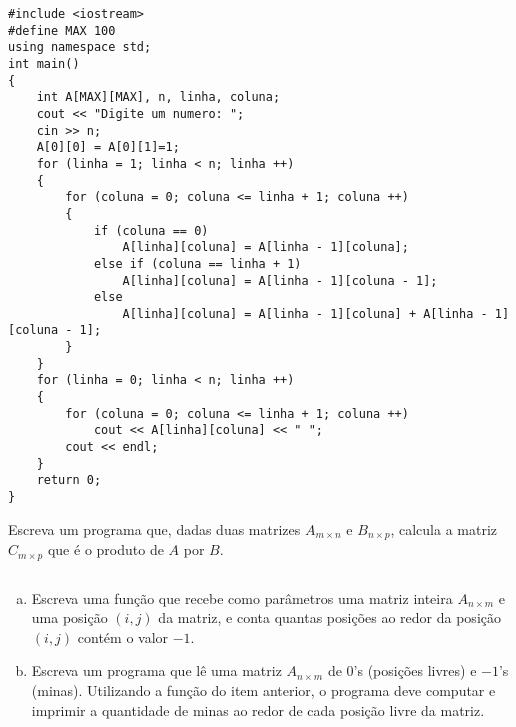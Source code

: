 \documentclass[a4paper]{memoir}
\begin{document}
\begin{sol}
\begin{lstlisting}
#include <iostream>
#define MAX 100
using namespace std;
int main()
{
    int A[MAX][MAX], n, linha, coluna;
    cout << "Digite um numero: ";
    cin >> n;
    A[0][0] = A[0][1]=1;
    for (linha = 1; linha < n; linha ++)
    {
        for (coluna = 0; coluna <= linha + 1; coluna ++)
        {
            if (coluna == 0)
                A[linha][coluna] = A[linha - 1][coluna];
            else if (coluna == linha + 1)
                A[linha][coluna] = A[linha - 1][coluna - 1];
            else
                A[linha][coluna] = A[linha - 1][coluna] + A[linha - 1][coluna - 1];
        }
    }
    for (linha = 0; linha < n; linha ++)
    {
        for (coluna = 0; coluna <= linha + 1; coluna ++)
            cout << A[linha][coluna] << " ";
        cout << endl;
    }
    return 0;
}
\end{lstlisting}
\end{sol}

\begin{prob}\label{prob308.cpp}
Escreva um programa que, dadas duas matrizes $A_{m \times n}$ e $B_{n \times p}$, calcula a matriz $C_{m \times p}$ que é o produto de $A$ por $B$.
\end{prob}

\begin{sol}
\begin{lstlisting}

\end{lstlisting}
\end{sol}

\begin{prob}\label{prob309.cpp}
\begin{enumerate}[a)]
 \item Escreva uma função que recebe como parâmetros uma matriz inteira $A_{n \times m}$ e uma posição $(i,j)$ da matriz, e conta quantas posições ao redor da posição $(i,j)$ contém o valor $-1$.
 \item Escreva um programa que lê uma matriz $A_{n \times m}$ de $0$'s (posições livres) e $-1$'s (minas). Utilizando a função do item anterior, o programa deve computar e imprimir a quantidade de minas ao redor de cada posição livre da matriz.
\end{enumerate}

\end{prob}
\end{document}
